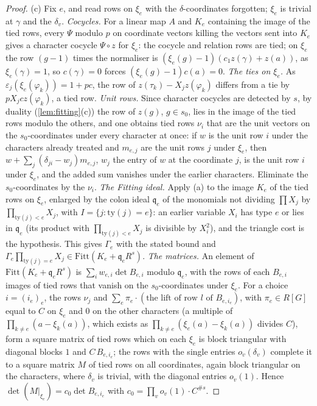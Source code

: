 \begin{proof}
(c) Fix $e$, and read rows on $\xi_e$ with the $\delta$-coordinates forgotten; $\xi_e$ is trivial at $\gamma$ and the $\delta_v$. \emph{Cocycles.} For a linear map $A$ and $K_e$ containing the image of the tied rows, every $\Psi$ modulo $p$ on coordinate
vectors killing the vectors sent into $K_e$ gives a character cocycle $\Psi\circ z$ for $\xi_e$: the cocycle and relation rows are tied; on $\xi_e$ the row $(g-1)$ times the normaliser is $(\xi_e(g)-1)(c_1z(\gamma)+z(a))$, as $\xi_e(\gamma)=1$, so
$c(\gamma)=0$ forces $(\xi_e(g)-1)c(a)=0$. \emph{The ties on $\xi_e$.} As $\varepsilon_j(\xi_e(\varphi_k))=1+pc$, the row of $z(\tau_k)-X_jz(\varphi_k)$ differs from a tie by $pX_jcz(\varphi_k)$, a tied row. \emph{Unit rows.} Since character cocycles are
detected by $s$, by duality (\cref{lem:fitting}(c)) the row of $z(g)$, $g\in s_0$, lies in the image of the tied rows modulo the others, and one obtains tied rows $\nu_i$ that are the unit vectors on the $s_0$-coordinates under every
character at once: if $w$ is the unit row $i$ under the characters already treated and $m_{e,j}$ are the unit rows $j$ under $\xi_e$, then $w+\sum_j(\delta_{ji}-w_j)m_{e,j}$, $w_j$ the entry of $w$ at the coordinate $j$, is the unit row $i$
under $\xi_e$, and the added sum vanishes under the earlier characters. Eliminate the $s_0$-coordinates by the $\nu_i$. \emph{The Fitting ideal.} Apply (a) to the image $K_e$ of the tied rows on $\xi_e$,
enlarged by the colon ideal $\mathfrak q_e$ of the monomials not dividing $\prod X_j$ by $\prod_{\mathrm{ty}(j)<e}X_j$, with $I=\{j:\mathrm{ty}(j)=e\}$: an earlier variable $X_i$ has type $e$ or lies in $\mathfrak q_e$ (its product with
$\prod_{\mathrm{ty}(j)<e}X_j$ is divisible by $X_i^2$), and the triangle cost is the hypothesis. This gives $\Gamma_e$ with the stated bound and $\Gamma_e\prod_{\mathrm{ty}(j)=e}X_j\in\mathrm{Fitt}(K_e+\mathfrak q_eR^s)$. \emph{The matrices.} An element of
$\mathrm{Fitt}(K_e+\mathfrak q_eR^s)$ is $\sum_iw_{e,i}\det B_{e,i}$ modulo $\mathfrak q_e$, with the rows of each $B_{e,i}$ images of tied rows that vanish on the $s_0$-coordinates under $\xi_e$. For a choice $i=(i_e)_e$, the rows $\nu_j$ and
$\sum_e\pi_e\cdot(\text{the lift of row }l\text{ of }B_{e,i_e})$, with $\pi_e\in R[G]$ equal to $C$ on $\xi_e$ and $0$ on the other characters (a multiple of $\prod_{k\ne e}(a-\xi_k(a))$, which exists as $\prod_{k\ne e}(\xi_e(a)-\xi_k(a))$ divides $C$), form a square matrix of tied rows which on each $\xi_e$ is block triangular with diagonal blocks $1$ and
$C\,B_{e,i_e}$; the rows with the single entries $o_v(\delta_v)$ complete it to a square matrix $M$ of tied rows on all coordinates, again block triangular on the characters, where $\delta_v$ is trivial, with the diagonal entries
$o_v(1)$. Hence $\det(M|_{\xi_e})=c_0\det B_{e,i_e}$ with $c_0=\prod_vo_v(1)\cdot C^{\#s}$.
\end{proof}

